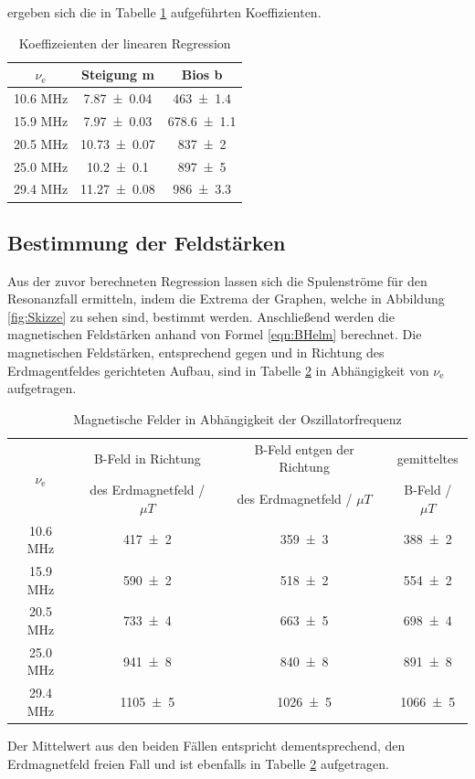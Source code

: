 ergeben sich die in Tabelle \ref{tab:stei} aufgeführten Koeffizienten. 
\begin{table}
  \centering
  \caption{Koeffizeienten der linearen Regression}
  \begin{tabular}{c|c c}
    \toprule
    	$\nu_\text{e}$ & Steigung m & Bios b \\
    \midrule
       	10.6 MHz & \num{7.87 +- 0.04}  & \num{463 +- 1.4} \\
	15.9 MHz & \num{7.97 +- 0.03}  & \num{678.6 +- 1.1} \\ 
	20.5 MHz & \num{10.73 +- 0.07} & \num{837 +- 2} \\
	25.0 MHz & \num{10.2 +- 0.1}   & \num{897 +- 5} \\
	29.4 MHz & \num{11.27 +- 0.08} & \num{986 +- 3.3}\\
    \bottomrule
  \end{tabular}
  \label{tab:stei}
\end{table}

\subsection{Bestimmung der Feldstärken}
Aus der zuvor berechneten Regression lassen sich die Spulenströme für den Resonanzfall ermitteln, indem die Extrema der Graphen, welche in Abbildung \ref{fig:Skizze} zu sehen sind, bestimmt werden. Anschließend werden die magnetischen Feldstärken anhand von Formel \ref{eqn:BHelm} berechnet. Die magnetischen Feldstärken, entsprechend gegen und in Richtung des Erdmagentfeldes gerichteten Aufbau, sind in Tabelle \ref{tab:magn} in Abhängigkeit von $\nu_\text{e}$ aufgetragen.  
\begin{table}
  \centering
  \caption{Magnetische Felder in Abhängigkeit der Oszillatorfrequenz}
  \begin{tabular}{c|c c c}
    \toprule
    \multirow{2}{*}{$\nu_\text{e}$} & B-Feld in Richtung & B-Feld entgen der Richtung & gemitteltes \\
    	& des Erdmagnetfeld / $\mu T$ & des Erdmagnetfeld / $\mu T$ & B-Feld / $\mu T$ \\
    \midrule
       	10.6 MHz & \num{417 +- 2} & \num{359 +- 3} & \num{388 +- 2} \\
	15.9 MHz & \num{590 +- 2} & \num{518 +- 2} & \num{554 +- 2} \\ 
	20.5 MHz & \num{733 +- 4} & \num{663 +- 5} & \num{698 +- 4} \\
	25.0 MHz & \num{941 +- 8} & \num{840 +- 8} & \num{891 +- 8} \\
	29.4 MHz & \num{1105 +- 5} & \num{1026 +- 5} & \num{1066 +- 5} \\
    \bottomrule
  \end{tabular}
  \label{tab:magn}
\end{table}
Der Mittelwert aus den beiden Fällen entspricht dementsprechend, den Erdmagnetfeld freien Fall und ist ebenfalls in Tabelle \ref{tab:magn} aufgetragen.
